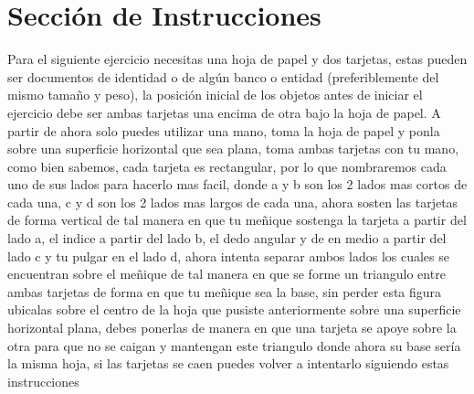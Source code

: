 \documentclass{article}
\begin{document}
\section{Sección de Instrucciones} \label{contenido}
Para el siguiente ejercicio necesitas una hoja de papel y dos tarjetas, estas pueden ser documentos de identidad o de algún banco o entidad (preferiblemente del mismo tamaño y peso), la posición inicial de los objetos antes de iniciar el ejercicio debe ser ambas tarjetas una encima de otra bajo la hoja de papel. A partir de ahora solo puedes utilizar una mano, toma la hoja de papel y ponla sobre una superficie horizontal que sea plana, toma ambas tarjetas con tu mano, como bien sabemos, cada tarjeta es rectangular, por lo que nombraremos cada uno de sus lados para hacerlo mas facil, donde a y b son los 2 lados mas cortos de cada una, c y d son los 2 lados mas largos de cada una, ahora sosten las tarjetas de forma vertical de tal manera en que tu meñique sostenga la tarjeta a partir del lado a, el indice a partir del lado b, el dedo angular y de en medio a partir del lado c y tu pulgar en el lado d, ahora intenta separar ambos lados los cuales se encuentran sobre el meñique de tal manera en que se forme un triangulo entre ambas tarjetas de forma en que tu meñique sea la base, sin perder esta figura ubicalas sobre el centro de la hoja que pusiste anteriormente sobre una superficie horizontal plana, debes ponerlas de manera en que una tarjeta se apoye sobre la otra para que no se caigan y mantengan este triangulo donde ahora su base sería la misma hoja, si las tarjetas se caen puedes volver a intentarlo siguiendo estas instrucciones
\end{document}

